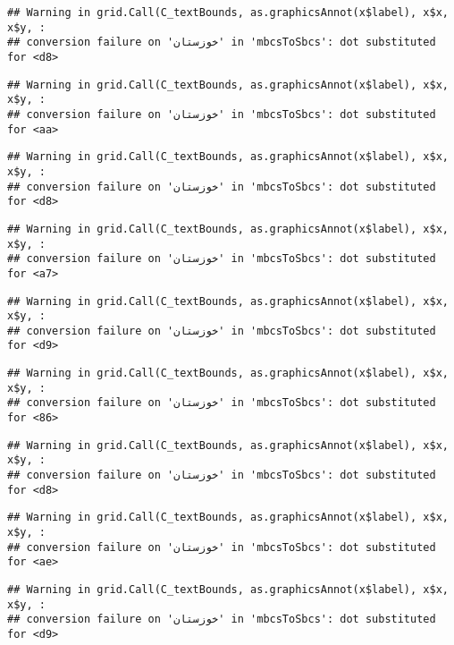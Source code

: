 \documentclass[
]{article}
\begin{document}
\begin{verbatim}
## Warning in grid.Call(C_textBounds, as.graphicsAnnot(x$label), x$x, x$y, :
## conversion failure on 'خوزستان' in 'mbcsToSbcs': dot substituted for <d8>
\end{verbatim}

\begin{verbatim}
## Warning in grid.Call(C_textBounds, as.graphicsAnnot(x$label), x$x, x$y, :
## conversion failure on 'خوزستان' in 'mbcsToSbcs': dot substituted for <aa>
\end{verbatim}

\begin{verbatim}
## Warning in grid.Call(C_textBounds, as.graphicsAnnot(x$label), x$x, x$y, :
## conversion failure on 'خوزستان' in 'mbcsToSbcs': dot substituted for <d8>
\end{verbatim}

\begin{verbatim}
## Warning in grid.Call(C_textBounds, as.graphicsAnnot(x$label), x$x, x$y, :
## conversion failure on 'خوزستان' in 'mbcsToSbcs': dot substituted for <a7>
\end{verbatim}

\begin{verbatim}
## Warning in grid.Call(C_textBounds, as.graphicsAnnot(x$label), x$x, x$y, :
## conversion failure on 'خوزستان' in 'mbcsToSbcs': dot substituted for <d9>
\end{verbatim}

\begin{verbatim}
## Warning in grid.Call(C_textBounds, as.graphicsAnnot(x$label), x$x, x$y, :
## conversion failure on 'خوزستان' in 'mbcsToSbcs': dot substituted for <86>
\end{verbatim}

\begin{verbatim}
## Warning in grid.Call(C_textBounds, as.graphicsAnnot(x$label), x$x, x$y, :
## conversion failure on 'خوزستان' in 'mbcsToSbcs': dot substituted for <d8>
\end{verbatim}

\begin{verbatim}
## Warning in grid.Call(C_textBounds, as.graphicsAnnot(x$label), x$x, x$y, :
## conversion failure on 'خوزستان' in 'mbcsToSbcs': dot substituted for <ae>
\end{verbatim}

\begin{verbatim}
## Warning in grid.Call(C_textBounds, as.graphicsAnnot(x$label), x$x, x$y, :
## conversion failure on 'خوزستان' in 'mbcsToSbcs': dot substituted for <d9>
\end{verbatim}
\end{document}
